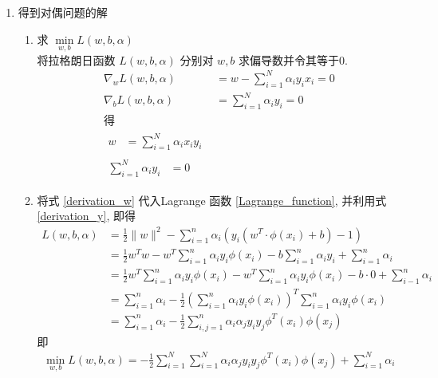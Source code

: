 \documentclass[oneside, 12pt]{ctexbook}
\begin{document}
\begin{enumerate}
\begin{enumerate}
							\item 得到对偶问题的解
								\begin{enumerate}[(1)]
									\item 求 $\min\limits_{w,b} L(w,b,\alpha)$\\
										将拉格朗日函数 $L(w,b,\alpha)$ 分别对 $w,b$ 求偏导数并令其等于0.
										\begin{align}
											\nabla_w L(w,b,\alpha) &= w - \sum_{i=1}^{N} \alpha_i y_i x_i= 0\\
											\nabla_b L(w,b,\alpha) &= \sum_{i=1}^{N} \alpha_i y_i = 0\\
											\text{得}\\
											\begin{split}
												w &= \sum_{i=1}^{N} \alpha_i x_i y_i
											\end{split} \label{derivation_w}\\
											\begin{split}
											\sum_{i=1}^{N} \alpha_i y_i &= 0
											\end{split}
											\label{derivation_y}
										\end{align}
										
									\item 将式 \ref{derivation_w} 代入Lagrange 函数 	\ref{Lagrange_function}, 并利用式 \ref{derivation_y}, 即得
										\begin{align}
											L(w,b,\alpha) &= \frac{1}{2} \parallel w \parallel ^2 - \sum_{i=1}^{n} \alpha_i (y_i(w^T \cdot \phi(x_i) + b) - 1)\\
											&= \frac{1}{2} w^T w - w^T \sum_{i=1}^{n} \alpha_i y_i \phi(x_i) - b\sum_{i=1}^{n} \alpha_i y_i + \sum_{i=1}^{n}\alpha_i\\
											&=\frac{1}{2}w^T \sum_{i=1}^{n}\alpha_i y_i \phi(x_i) - w^T \sum_{i=1}^{n}\alpha_i y_i \phi(x_i) - b\cdot 0 + \sum_{i-1}^{n}\alpha_i\\
											&= \sum_{i=1}^{n}\alpha_i - \frac{1}{2}\left( \sum_{i=1}^{n} \alpha_i y_i \phi(x_i) \right)^T \sum_{i=1}^{n}\alpha_i y_i \phi(x_i)\\
											&= \sum_{i=1}^{n}\alpha_i - \frac{1}{2}\sum_{i,j=1}^{n}\alpha_i \alpha_j y_i y_j \phi^T(x_i) \phi(x_j)				
										\end{align}
										即
										\begin{align}
											\min\limits_{w,b} L(w,b,\alpha) = -\frac{1}{2} \sum_{i=1}^{N}\sum_{i=1}^{N}\alpha_i \alpha_j y_i y_j \phi^T(x_i) \phi(x_j) + \sum_{i=1}^{N}\alpha_i
										\end{align}
										

\end{enumerate}
\end{enumerate}
\end{enumerate}
\end{document}
